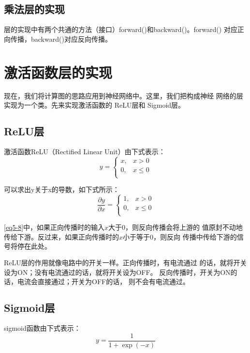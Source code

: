 \subsection{乘法层的实现}
层的实现中有两个共通的方法（接口）forward()和backward()。forward()
对应正向传播，backward()对应反向传播。

\section{激活函数层的实现}
现在，我们将计算图的思路应用到神经网络中。这里，我们把构成神经
网络的层实现为一个类。先来实现激活函数的 ReLU层和 Sigmoid层。
\subsection{ReLU层}
激活函数ReLU（Rectified Linear Unit）由下式表示：
\begin{equation*}
    y = \left\{
    \begin{array}{ll}
        x, & x>0     \\
        0, & x\leq 0 \\
    \end{array}
    \right.
\end{equation*}

可以求出y关于x的导数，如下式所示：
\begin{equation}
    \label{eq5-8}
    \frac{\partial y}{\partial x} = \left\{
    \begin{array}{ll}
        1, & x>0     \\
        0, & x\leq 0 \\
    \end{array}
    \right.
\end{equation}

\autoref{eq5-8}中，如果正向传播时的输入$x$大于0，则反向传播会将上游的
值原封不动地传给下游。反过来，如果正向传播时的$x$小于等于0，则反向
传播中传给下游的信号将停在此处。

\begin{tcolorbox}
    ReLU层的作用就像电路中的开关一样。正向传播时，有电流通过
    的话，就将开关设为ON；没有电流通过的话，就将开关设为OFF。
    反向传播时，开关为ON的话，电流会直接通过；开关为OFF的话，
    则不会有电流通过。
\end{tcolorbox}

\subsection{Sigmoid层}
sigmoid函数由下式表示：
\begin{equation*}
    y=\frac{1}{1+\exp(-x)}
\end{equation*}

